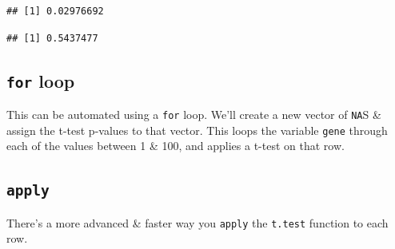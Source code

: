 \documentclass[]{article}
\newenvironment{Shaded}{\begin{snugshade}}{\end{snugshade}}
\newcommand{\KeywordTok}[1]{\textcolor[rgb]{0.13,0.29,0.53}{\textbf{#1}}}
\newcommand{\DataTypeTok}[1]{\textcolor[rgb]{0.13,0.29,0.53}{#1}}
\newcommand{\DecValTok}[1]{\textcolor[rgb]{0.00,0.00,0.81}{#1}}
\newcommand{\StringTok}[1]{\textcolor[rgb]{0.31,0.60,0.02}{#1}}
\newcommand{\CommentTok}[1]{\textcolor[rgb]{0.56,0.35,0.01}{\textit{#1}}}
\newcommand{\OtherTok}[1]{\textcolor[rgb]{0.56,0.35,0.01}{#1}}
\newcommand{\ControlFlowTok}[1]{\textcolor[rgb]{0.13,0.29,0.53}{\textbf{#1}}}
\newcommand{\OperatorTok}[1]{\textcolor[rgb]{0.81,0.36,0.00}{\textbf{#1}}}
\newcommand{\NormalTok}[1]{#1}
\begin{document}
\begin{verbatim}
## [1] 0.02976692
\end{verbatim}

\begin{Shaded}
\end{Shaded}

\begin{verbatim}
## [1] 0.5437477
\end{verbatim}

\subsection{\texorpdfstring{\texttt{for}
loop}{for loop}}\label{for-loop}

This can be automated using a \texttt{for} loop. We'll create a new
vector of \texttt{NA}S \& assign the t-test p-values to that vector.
This loops the variable \texttt{gene} through each of the values between
1 \& 100, and applies a t-test on that row.

\begin{Shaded}
\end{Shaded}

\subsection{\texorpdfstring{\texttt{apply}}{apply}}\label{apply}

There's a more advanced \& faster way you \texttt{apply} the
\texttt{t.test} function to each row.
\end{document}
